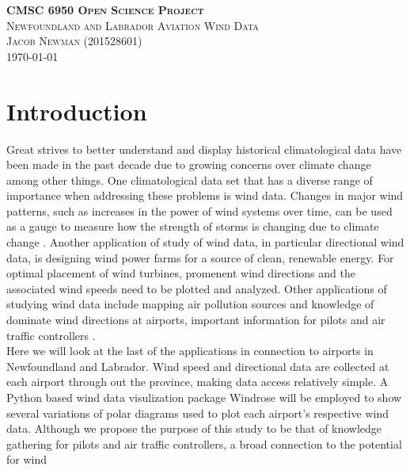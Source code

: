 \documentclass{article}
\begin{document}
\begin{titlepage}
\newcommand{\HRule}{\rule{\linewidth}{0.5mm}}

\center
\textsc{\LARGE \textbf{CMSC 6950 Open Science Project}}\\[1 cm]

\textsc{\Large Newfoundland and Labrador Aviation Wind Data}\\[0.5 cm]

\textsc{\large Jacob Newman (201528601)}\\[0.5 cm]





\vfill\vfill\vfill
{\large\today}
\vfill

\end{titlepage}


\section{Introduction}\label{Introduction}
Great strives to better understand and display historical climatological data have been made in the past decade due to growing concerns over climate change among other things. One climatological data set 
that has a diverse range of importance when addressing these problems is wind data. Changes in major wind patterns, such as increases in the power of wind systems over time, can be used as a gauge to 
measure how the strength of storms is changing due to climate change \cite{Mendelsohn2012}. Another application of study of wind data, in particular directional wind data, is designing wind power 
farms \cite{CETINAY201751} for a source of clean, renewable energy. For optimal placement of wind turbines, promenent wind directions and the associated wind speeds need to be plotted and 
analyzed. Other applications of studying wind data include mapping air pollution sources \cite{ADAMS2016133} and knowledge of dominate wind directions at airports, important information for 
pilots and air traffic controllers \cite{jairm26}.
\\
\indent Here we will look at the last of the applications in connection to airports in Newfoundland and Labrador. Wind speed and directional data are collected at each airport through out the province, 
making data access relatively simple. A Python based wind data visulization package Windrose \cite{Roubeyrie2018} will be employed to show several variations of polar diagrams used to plot each 
airport's respective wind data. Although we propose the purpose of this study to be that of knowledge gathering for pilots and air traffic controllers, a broad connection to the potential for wind 
\end{document}
